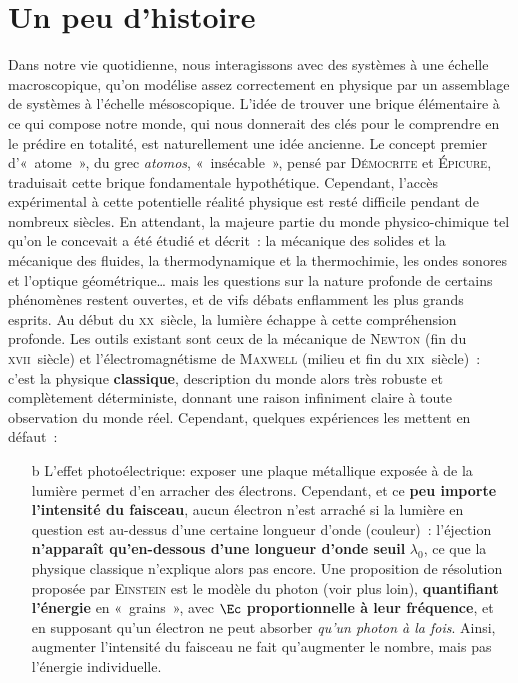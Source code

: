 \documentclass[../../main/main.tex]{subfiles}
\begin{document}
\section{Un peu d'histoire}
\label{sec:mqhistoire}
Dans notre vie quotidienne, nous interagissons avec des systèmes à une échelle
macroscopique, qu'on modélise assez correctement en physique par un assemblage
de systèmes à l'échelle mésoscopique. L'idée de trouver une brique élémentaire à
ce qui compose notre monde, qui nous donnerait des clés pour le comprendre en le
prédire en totalité, est naturellement une idée ancienne. Le concept premier
d'«~atome~», du grec \textit{atomos}, «~insécable~», pensé par
\textsc{Démocrite} et \textsc{Épicure}, traduisait cette brique fondamentale
hypothétique. Cependant, l'accès expérimental à cette potentielle réalité
physique est resté difficile pendant de nombreux siècles.
\bigbreak
En attendant, la majeure partie du monde physico-chimique tel qu'on le concevait
a été étudié et décrit~: la mécanique des solides et la mécanique des fluides,
la thermodynamique et la thermochimie, les ondes sonores et l'optique
géométrique… mais les questions sur la nature profonde de certains phénomènes
restent ouvertes, et de vifs débats enflamment les plus grands esprits.
\bigbreak
Au début du \textsc{xx}\ieme\ siècle, la lumière échappe à cette compréhension
profonde. Les outils existant sont ceux de la mécanique de \textsc{Newton} (fin
du \textsc{xvii}\ieme\ siècle) et l'électromagnétisme de \textsc{Maxwell}
(milieu et fin du \textsc{xix}\ieme\ siècle)~: c'est la physique
\textbf{classique}, description du monde alors très robuste et complètement
déterministe, donnant une raison infiniment claire à toute observation du monde
réel. Cependant, quelques expériences les mettent en défaut~:
\bigbreak
\noindent
\begin{minipage}[c]{.60\linewidth}
	\begin{itemize}
		\item[b]{L'effet photoélectrique}: exposer une plaque métallique exposée à de
		la lumière permet d'en arracher des électrons. Cependant, et ce \textbf{peu
			importe l'intensité du faisceau}, aucun électron n'est arraché si la lumière
		en question est au-dessus d'une certaine longueur d'onde (couleur)~:
		l'éjection \textbf{n'apparaît qu'en-dessous d'une longueur d'onde seuil}
		$\lambda_0$, ce que la physique classique n'explique alors pas encore.
		\bigbreak
		Une proposition de résolution proposée par \textsc{Einstein} est le modèle
		du photon (voir plus loin), \textbf{quantifiant l'énergie} en «~grains~»,
		avec $\Ec$ \textbf{proportionnelle à leur fréquence}, et en supposant qu'un
		électron ne peut absorber \textit{qu'un photon à la fois}. Ainsi, augmenter
		l'intensité du faisceau ne fait qu'augmenter le nombre, mais pas l'énergie
		individuelle.
	\end{itemize}
\end{minipage}
\end{document}
